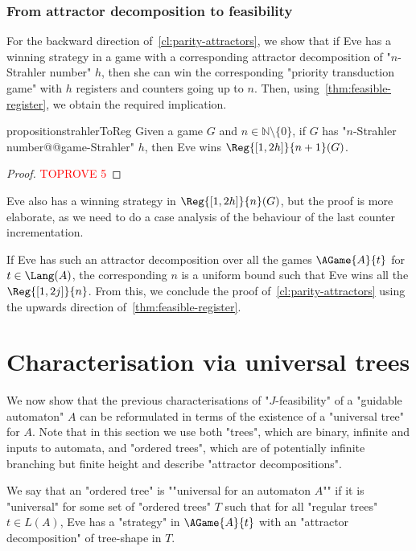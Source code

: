 \documentclass[a4paper,UKenglish,cleveref, autoref, thm-restate]{lipics-v2021}
\newcommand{\NN}{\mathbb{N}}
\newcommand{\A}{{A}}
\begin{document}
\subsubsection{From attractor decomposition to feasibility}

For the backward direction of~\cref{cl:parity-attractors}, we show that if Eve has a winning strategy in a game with a corresponding attractor decomposition of "$n$-Strahler number" $h$, then she can win the corresponding "priority transduction game" with $h$ registers and counters going up to $n$. Then, using~\cref{thm:feasible-register}, we obtain the required implication.

\begin{restatable}{proposition}{strahlerToReg}\label{lem:Strahler-to-Reg}
Given a game $G$ and $n\in \NN\setminus\{0\}$, if $G$ has "$n$-Strahler number@@game-Strahler" $h$, then Eve wins $\Reg{[1,2h]}{n+1}(G)$.
\end{restatable}

\begin{proof}\textcolor{red}{TOPROVE 5}\end{proof}


\begin{remark}
	 Eve also has a winning strategy in $\Reg{[1,2h]}{n}(G)$, but the proof is more elaborate, as we need to do a case analysis of the behaviour of the last counter incrementation.
\end{remark}

If  Eve has such an attractor decomposition over all the games $\AGame{A}{t}$ for $t\in \Lang(A)$, the corresponding $n$ is a uniform bound such that Eve wins all the $\Reg{[1,2j]}{n}$. From this, we conclude the proof of~\cref{cl:parity-attractors} using the upwards direction of~\cref{thm:feasible-register}.


\section{Characterisation via universal trees}\label{sec:universal}

We now show that the previous characterisations of "$J$-feasibility" of a "guidable automaton" $\A$ can be reformulated in terms of the existence of a "universal tree" for $\A$. Note that in this section we use both "trees", which are binary, infinite and inputs to automata, and "ordered trees", which are of potentially infinite branching but finite height and describe "attractor decompositions".

\AP We say that an "ordered tree" is ""universal for an automaton $\A$"" if it is "universal" for some set of "ordered trees" $T$ such that for all "regular trees" $t\in L(\A)$, Eve has a "strategy" in $\AGame{\A}{t}$ with an "attractor decomposition" of tree-shape in $T$.
\end{document}
